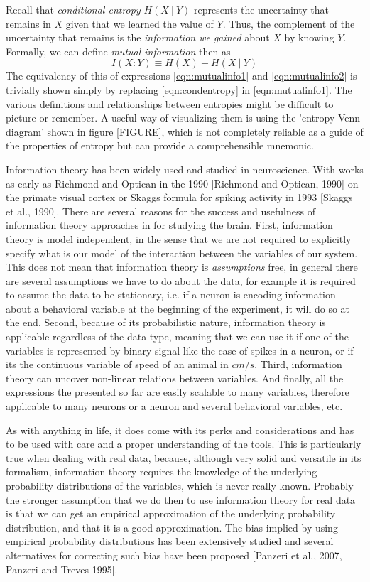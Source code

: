 Recall that \textit{conditional entropy} $H(X\ |\ Y)$ represents the uncertainty that remains in $X$ given that we learned the value of $Y$.
Thus, the complement of the uncertainty that remains is the \textit{information we gained} about $X$ by knowing $Y$. Formally, we can define \textit{mutual information} then as 
\begin{equation}
\label{eqn:mutualinfo2}
    I(X:Y)\equiv H(X) - H(X\ |\ Y)
\end{equation}
The equivalency of this of expressions \ref{eqn:mutualinfo1} and \ref{eqn:mutualinfo2}
is trivially shown simply by replacing \ref{eqn:condentropy} in \ref{eqn:mutualinfo1}.
The various definitions and relationships between entropies might be difficult to picture or remember. 
A useful way of visualizing them is using the 'entropy Venn diagram' shown in figure [FIGURE], which is not completely reliable as a guide of the properties of entropy but can provide a comprehensible mnemonic. 

Information theory has been widely used and studied in neuroscience.
With works as early as Richmond and Optican in the 1990 [Richmond and Optican, 1990] on the primate visual cortex or Skaggs formula for spiking activity in 1993 [Skaggs et al., 1990].
There are several reasons for the success and usefulness of information theory approaches in for studying the brain.
First, information theory is model independent, in the sense that we are not required to explicitly specify what is our model of the interaction between the variables of our system.
This does not mean that information theory is \textit{assumptions} free, in general there are several assumptions we have to do about the data, for example it is required to assume the data to be stationary, i.e. if a neuron is encoding information about a behavioral variable at the beginning of the experiment, it will do so at the end.     
Second, because of its probabilistic nature, information theory is applicable regardless of the data type, meaning that we can use it if one of the variables is represented by binary signal like the case of spikes in a neuron, or if its the continuous variable of speed of an animal in $cm/s$.
Third, information theory can uncover non-linear relations between variables.
And finally, all the expressions the presented so far are easily scalable to many variables, therefore applicable to many neurons or a neuron and several behavioral variables, etc. 

As with anything in life, it does come with its perks and considerations and has to be used with care and a proper understanding of the tools.
This is particularly true when dealing with real data, because, although very solid and versatile in its formalism, information theory requires the knowledge of the underlying probability distributions of the variables, which is never really known. 
Probably the stronger assumption that we do then to use information theory for real data is that we can get an empirical approximation of the underlying probability distribution, and that it is a good approximation. 
The bias implied by using empirical probability distributions has been extensively studied and several alternatives for correcting such bias have been proposed [Panzeri et al., 2007, Panzeri and Treves 1995].

